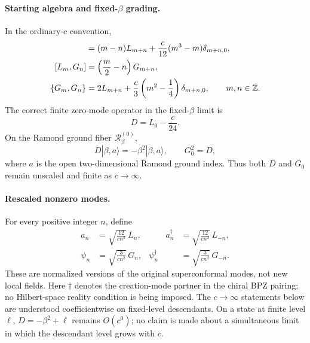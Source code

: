 \documentclass[11pt]{article}
\begin{document}
\paragraph{Starting algebra and fixed-\(\beta\) grading.}
In the ordinary-\(c\) convention,
\begin{align}
 [L_m,L_n]
 &=(m-n)L_{m+n}
 +\frac{c}{12}(m^3-m)\delta_{m+n,0},
 \notag\\
 [L_m,G_n]
 &=\left(\frac m2-n\right)G_{m+n},
 \notag\\
 \{G_m,G_n\}
 &=2L_{m+n}
 +\frac c3\left(m^2-\frac14\right)\delta_{m+n,0},
 \qquad m,n\in\mathbb Z .
 \label{eq:r-supervir-algebra}
\end{align}
The correct finite zero-mode operator in the fixed-\(\beta\) limit is
\begin{equation}
 D=L_0-\frac c{24}.
 \label{eq:contracted-D}
\end{equation}
On the Ramond ground fiber
\(\mathcal R_\beta^{(0)}\),
\begin{equation}
 D|\beta,a\rangle=-\beta^2|\beta,a\rangle,
 \qquad
 G_0^2=D,
 \label{eq:contracted-ground}
\end{equation}
where \(a\) is the open two-dimensional Ramond ground index.  Thus both
\(D\) and \(G_0\) remain unscaled and finite as \(c\to\infty\).

\paragraph{Rescaled nonzero modes.}
For every positive integer \(n\), define
\begin{equation}
 \begin{aligned}
 a_n&=\sqrt{\frac{12}{cn^3}}\,L_n,
 &\qquad
 a_n^\dagger&=\sqrt{\frac{12}{cn^3}}\,L_{-n},
 \\
 \psi_n&=\sqrt{\frac{3}{cn^2}}\,G_n,
 &
 \psi_n^\dagger&=\sqrt{\frac{3}{cn^2}}\,G_{-n}.
 \end{aligned}
 \label{eq:contracted-oscillators}
\end{equation}
These are normalized versions of the original superconformal modes, not
new local fields.  Here \(\dagger\) denotes the creation-mode partner in
the chiral BPZ pairing; no Hilbert-space reality condition is being
imposed.  The \(c\to\infty\) statements below are understood
coefficientwise on fixed-level descendants.  On a state at finite level
\(\ell\), \(D=-\beta^2+\ell\) remains \(O(c^0)\); no claim is made about a
simultaneous limit in which the descendant level grows with \(c\).
\end{document}

